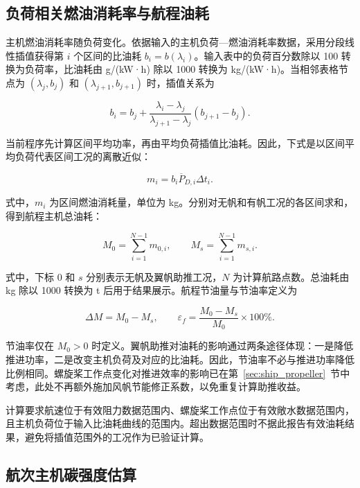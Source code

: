 \documentclass[UTF8,a4paper,twoside,zihao=5,fontset=windows]{ctexart}
\begin{document}
\subsection{负荷相关燃油消耗率与航程油耗}

主机燃油消耗率随负荷变化。依据输入的主机负荷—燃油消耗率数据，采用分段线性插值获得第 $i$ 个区间的比油耗 $b_i=b(\lambda_i)$。输入表中的负荷百分数除以 100 转换为负荷率，比油耗由 g/(kW·h) 除以 1000 转换为 kg/(kW·h)。当相邻表格节点为 $(\lambda_j,b_j)$ 和 $(\lambda_{j+1},b_{j+1})$ 时，插值关系为

\begin{equation}
b_i=b_j+\frac{\lambda_i-\lambda_j}{\lambda_{j+1}-\lambda_j}(b_{j+1}-b_j).
\label{eq:fuel-cii-4}
\end{equation}

当前程序先计算区间平均功率，再由平均负荷插值比油耗。因此，下式是以区间平均负荷代表区间工况的离散近似：

\begin{equation}
m_i=b_i\overline{P}_{D,i}\Delta t_i.
\label{eq:fuel-cii-5}
\end{equation}

式中，$m_i$ 为区间燃油消耗量，单位为 kg。分别对无帆和有帆工况的各区间求和，得到航程主机总油耗：

\begin{equation}
M_0=\sum_{i=1}^{N-1}m_{0,i},\qquad
M_s=\sum_{i=1}^{N-1}m_{s,i}.
\label{eq:fuel-cii-6}
\end{equation}

式中，下标 $0$ 和 $s$ 分别表示无帆及翼帆助推工况，$N$ 为计算航路点数。总油耗由 kg 除以 1000 转换为 t 后用于结果展示。航程节油量与节油率定义为

\begin{equation}
\Delta M=M_0-M_s,\qquad
\varepsilon_f=\frac{M_0-M_s}{M_0}\times100\%.
\label{eq:fuel-cii-7}
\end{equation}

节油率仅在 $M_0>0$ 时定义。翼帆助推对油耗的影响通过两条途径体现：一是降低推进功率，二是改变主机负荷及对应的比油耗。因此，节油率不必与推进功率降低比例相同。螺旋桨工作点变化对推进效率的影响已在第~\ref{sec:ship_propeller}~节中考虑，此处不再额外施加风帆节能修正系数，以免重复计算助推收益。

计算要求航速位于有效阻力数据范围内、螺旋桨工作点位于有效敞水数据范围内，且主机负荷位于输入比油耗曲线的范围内。超出数据范围时不据此报告有效油耗结果，避免将插值范围外的工况作为已验证计算。

\subsection{航次主机碳强度估算}
\end{document}
